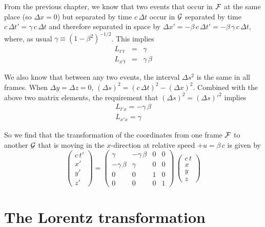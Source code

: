 From the previous chapter, we know that two events that occur in
$\cal F$ at the same place (so $\Delta x=0$) but separated by time
$c\,\Delta t$ occur in $\cal G$ separated by time $c\,\Delta
t'=\gamma\, c\,\Delta t$ and therefore separated in space by $\Delta
x'=-\beta\,c\,\Delta t'=-\beta\,\gamma\, c\,\Delta t$, where, as usual
$\gamma\equiv(1-\beta^2)^{-1/2}$.  This implies
\begin{eqnarray}
L_{t't} & = & \gamma \nonumber\\
L_{x't} & = & \gamma\,\beta
\end{eqnarray}

We also know that between any two events, the interval $\Delta s^2$ is
the same in all frames.  When $\Delta y=\Delta z=0$, $(\Delta
s)^2=(c\,\Delta t)^2-(\Delta x)^2$.  Combined with the above two
matrix elements, the requirement that $(\Delta s)^2=(\Delta s)'^2$
implies
\begin{eqnarray}
L_{t'x} = - \gamma\,\beta \nonumber\\
L_{x'x} = \gamma
\end{eqnarray}

So we find that the transformation of the coordinates from one frame
$\cal F$ to another $\cal G$ that is moving in the $x$-direction at
relative speed $+u=\beta\,c$ is given by
\begin{equation}
\left(\begin{array}{c} c\,t' \\ x' \\ y' \\ z' \end{array}\right) =
\left(\begin{array}{cccc}
\gamma        & - \gamma\,\beta & 0 & 0 \\
- \gamma\,\beta & \gamma        & 0 & 0 \\
0             & 0             & 1 & 0 \\
0             & 0             & 0 & 1
\end{array}\right)\,
\left(\begin{array}{c} c\,t \\ x \\ y \\ z \end{array}\right)
\end{equation}


\section{The Lorentz transformation}
\label{sec:lt}

